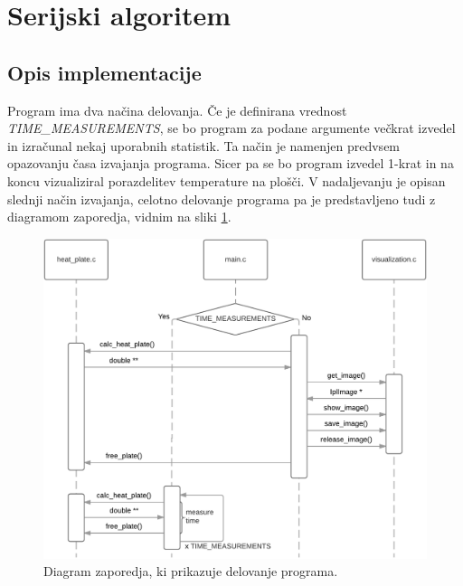 \documentclass[a4paper,titlepage,11pt]{article}
\begin{document}
\pagebreak

\section{Serijski algoritem}

\subsection{Opis implementacije}

Program ima dva načina delovanja. Če je definirana vrednost \textit{TIME\_MEASUREMENTS}, se bo program za podane argumente večkrat izvedel in izračunal nekaj uporabnih statistik. Ta način je namenjen predvsem opazovanju časa izvajanja programa. Sicer pa se bo program izvedel 1-krat in na koncu vizualiziral porazdelitev temperature na plošči. V nadaljevanju je opisan slednji način izvajanja, celotno delovanje programa pa je predstavljeno tudi z diagramom zaporedja, vidnim na sliki \ref{diagram-zaporedja}.

\begin{figure}[H]
\begin{center}
\includegraphics[scale=0.8]{diagram-zaporedja.png}
\caption{Diagram zaporedja, ki prikazuje delovanje programa.}
\label{diagram-zaporedja}
\end{center}
\vspace{-25pt}
\end{figure}
\end{document}
